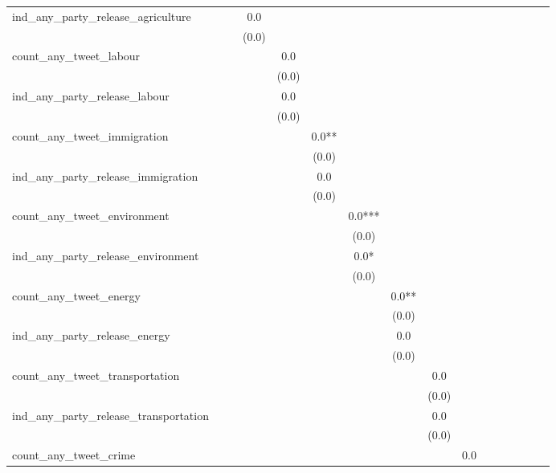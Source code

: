\begin{table}
\begin{tabular}[t]{lccccccccccccccc}
ind\_any\_party\_release\_agriculture &  &  & \num{0.0} &  &  &  &  &  &  &  &  &  &  &  & \\
 &  &  & (\num{0.0}) &  &  &  &  &  &  &  &  &  &  &  & \\
count\_any\_tweet\_labour &  &  &  & \num{0.0} &  &  &  &  &  &  &  &  &  &  & \\
 &  &  &  & (\num{0.0}) &  &  &  &  &  &  &  &  &  &  \vphantom{1} & \\
ind\_any\_party\_release\_labour &  &  &  & \num{0.0} &  &  &  &  &  &  &  &  &  &  & \\
 &  &  &  & (\num{0.0}) &  &  &  &  &  &  &  &  &  &  & \\
count\_any\_tweet\_immigration &  &  &  &  & \num{0.0}** &  &  &  &  &  &  &  &  &  & \\
 &  &  &  &  & (\num{0.0}) &  &  &  &  &  &  &  &  &  \vphantom{1} & \\
ind\_any\_party\_release\_immigration &  &  &  &  & \num{0.0} &  &  &  &  &  &  &  &  &  & \\
 &  &  &  &  & (\num{0.0}) &  &  &  &  &  &  &  &  &  & \\
count\_any\_tweet\_environment &  &  &  &  &  & \num{0.0}*** &  &  &  &  &  &  &  &  & \\
 &  &  &  &  &  & (\num{0.0}) &  &  &  &  &  &  &  &  \vphantom{1} & \\
ind\_any\_party\_release\_environment &  &  &  &  &  & \num{0.0}* &  &  &  &  &  &  &  &  & \\
 &  &  &  &  &  & (\num{0.0}) &  &  &  &  &  &  &  &  & \\
count\_any\_tweet\_energy &  &  &  &  &  &  & \num{0.0}** &  &  &  &  &  &  &  & \\
 &  &  &  &  &  &  & (\num{0.0}) &  &  &  &  &  &  &  \vphantom{1} & \\
ind\_any\_party\_release\_energy &  &  &  &  &  &  & \num{0.0} &  &  &  &  &  &  &  & \\
 &  &  &  &  &  &  & (\num{0.0}) &  &  &  &  &  &  &  & \\
count\_any\_tweet\_transportation &  &  &  &  &  &  &  & \num{0.0} &  &  &  &  &  &  & \\
 &  &  &  &  &  &  &  & (\num{0.0}) &  &  &  &  &  &  \vphantom{1} & \\
ind\_any\_party\_release\_transportation &  &  &  &  &  &  &  & \num{0.0} &  &  &  &  &  &  & \\
 &  &  &  &  &  &  &  & (\num{0.0}) &  &  &  &  &  &  & \\
count\_any\_tweet\_crime &  &  &  &  &  &  &  &  & \num{0.0} &  &  &  &  &  & \\

\end{tabular}
\end{table}

